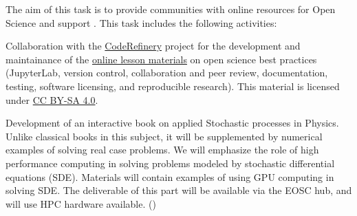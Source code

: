 \begin{task}[
  title=Online resources for open science,
  id=online-resources,
  lead=INSERM,
  PM=14,
  wphases={0-48},
  partners={SRL,XFEL,QS,CDS,WTT,SIL,UPSUD,EP}
]
  The aim of this task is to provide communities with online resources for Open Science and support .
  This task includes the following activities:
  \begin{compactitem}
  \item Collaboration with the \href{https://coderefinery.org}{CodeRefinery} project for the development and maintainance of the \href{https://coderefinery.org/lessons/}{online lesson materials} on open science best practices (JupyterLab, version control, collaboration and peer review, documentation, testing, software licensing, and reproducible research).
  This material is licensed under \href{https://creativecommons.org/licenses/by-sa/4.0/}{CC BY-SA 4.0}.
  \item Development of an interactive book on applied Stochastic processes in Physics. Unlike classical books in this subject, it will be supplemented by numerical examples of solving real case problems. We will emphasize the
role of high performance computing in solving problems modeled by stochastic differential equations (SDE). Materials will contain examples of using GPU computing in solving SDE. The deliverable of this part will be available via the EOSC hub, and will use HPC hardware available. ()
  \end{compactitem}
\end{task}
